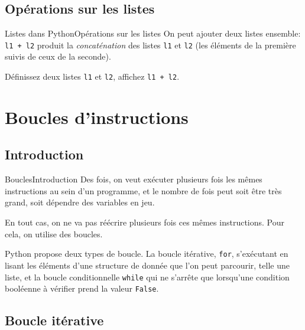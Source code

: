 \subsection{Opérations sur les listes}

\begin{frame}[fragile]{Listes dans Python}{Opérations sur les listes}
	On peut ajouter deux listes ensemble: \lstinline|l1 + l2| produit la \textit{concaténation} des listes \lstinline|l1| et \lstinline|l2| (les éléments de la première suivis de ceux de la seconde).
	
	\begin{exem}
		Définissez deux listes \lstinline|l1| et \lstinline|l2|, affichez \lstinline|l1 + l2|.
	\end{exem}
\end{frame}

\section{Boucles d'instructions}
\subsection{Introduction}

\begin{frame}[fragile]{Boucles}{Introduction}
	Des fois, on veut exécuter plusieurs fois les mêmes instructions au sein d'un programme, et le nombre de fois peut soit être très grand, soit dépendre des variables en jeu.
	\pause
	
	En tout cas, on ne va pas réécrire plusieurs fois ces mêmes instructions. Pour cela, on utilise des boucles.
	\pause
	
	Python propose deux types de boucle. La boucle itérative, \lstinline|for|, s'exécutant en lisant les éléments d'une structure de donnée que l'on peut parcourir, telle une liste, et la boucle conditionnelle \lstinline|while| qui ne s'arrête que lorsqu'une condition booléenne à vérifier prend la valeur \lstinline|False|.
\end{frame}

\subsection{Boucle itérative}


